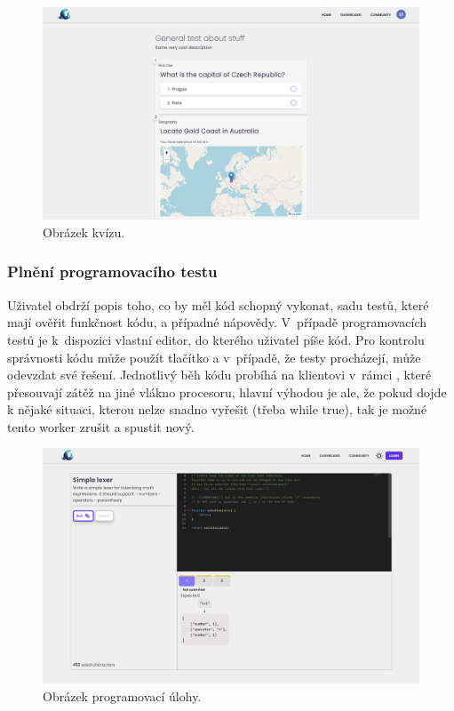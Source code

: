 \documentclass[12pt, a4paper,
openright
]{report}
\begin{document}
\begin{figure}[H]
	\centering %
	\includegraphics[width=0.75\linewidth]{image/test-taking.png} 
	\caption{Obrázek kvízu.} %
	\label{fig:test-taking} %
\end{figure}

\subsubsection{Plnění programovacího testu}
Uživatel obdrží popis toho, co by měl kód schopný vykonat, sadu testů, které mají ověřit funkčnost kódu, a případné nápovědy. V~případě programovacích testů je k~dispozici vlastní editor, do kterého uživatel píše kód. Pro kontrolu správnosti kódu může použít tlačítko \textit{} a v~případě, že testy procházejí, může odevzdat své řešení. Jednotlivý běh kódu probíhá na klientovi v~rámci , které přesouvají zátěž na jiné vlákno procesoru, hlavní výhodou je ale, že pokud dojde k nějaké situaci, kterou nelze snadno vyřešit (třeba while true), tak je možné tento worker zrušit a spustit nový.

\begin{figure}[H]
	\centering %
	\includegraphics[width=0.75\linewidth]{image/programming.png} 
	\caption{Obrázek programovací úlohy.} %
	\label{fig:programming} %
\end{figure}
\end{document}
